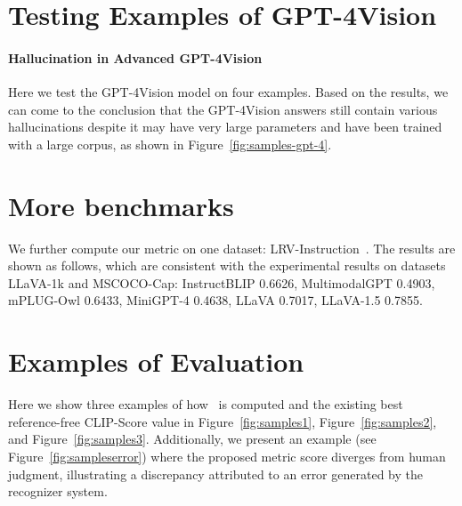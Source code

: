 \section{Testing Examples of GPT-4Vision} 
\label{exgpt4v}

\paragraph{Hallucination in Advanced GPT-4Vision}




Here we test the GPT-4Vision model on four examples. Based on the results, we can come to the conclusion that the GPT-4Vision answers still contain various hallucinations despite it may have very large parameters and have been trained with a large corpus, as shown in Figure~\ref{fig:samples-gpt-4}.


\section{More benchmarks}
We further compute our metric on one dataset: LRV-Instruction~\cite{DBLP:journals/corr/abs-2306-14565}. The results are shown as follows, which are consistent with the experimental results on datasets LLaVA-1k and MSCOCO-Cap:  
InstructBLIP 0.6626, 
MultimodalGPT 0.4903, 
mPLUG-Owl 0.6433, 
MiniGPT-4 0.4638, 
LLaVA 0.7017, 
LLaVA-1.5 0.7855. 


\section{Examples of Evaluation}
\label{exanno}
Here we show three examples of how \ours\ is computed and the existing best reference-free CLIP-Score value in Figure~\ref{fig:samples1}, Figure~\ref{fig:samples2}, and Figure~\ref{fig:samples3}. 
Additionally, we present an example (see Figure~\ref{fig:sampleserror}) where the proposed metric score diverges from human judgment, illustrating a discrepancy attributed to an error generated by the recognizer system.


